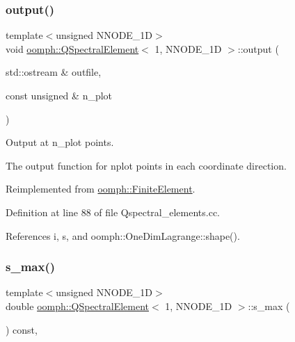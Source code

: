 \subsubsection{\texorpdfstring{output()}{output()}\hspace{0.1cm}{\footnotesize\ttfamily [4/4]}}
{\footnotesize\ttfamily template$<$unsigned N\+N\+O\+D\+E\+\_\+1D$>$ \\
void \hyperlink{classoomph_1_1QSpectralElement}{oomph\+::\+Q\+Spectral\+Element}$<$ 1, N\+N\+O\+D\+E\+\_\+1D $>$\+::output (\begin{DoxyParamCaption}\item[{std\+::ostream \&}]{outfile,  }\item[{const unsigned \&}]{n\+\_\+plot }\end{DoxyParamCaption})\hspace{0.3cm}{\ttfamily [virtual]}}



Output at n\+\_\+plot points. 

The output function for nplot points in each coordinate direction. 

Reimplemented from \hyperlink{classoomph_1_1FiniteElement_afa9d9b2670f999b43e6679c9dd28c457}{oomph\+::\+Finite\+Element}.



Definition at line 88 of file Qspectral\+\_\+elements.\+cc.



References i, s, and oomph\+::\+One\+Dim\+Lagrange\+::shape().

\mbox{\label{classoomph_1_1QSpectralElement_3_011_00_01NNODE__1D_01_4_ae69c91dbf1b80e9fef73ada0f899b8c8}} 
\subsubsection{\texorpdfstring{s\+\_\+max()}{s\_max()}}
{\footnotesize\ttfamily template$<$unsigned N\+N\+O\+D\+E\+\_\+1D$>$ \\
double \hyperlink{classoomph_1_1QSpectralElement}{oomph\+::\+Q\+Spectral\+Element}$<$ 1, N\+N\+O\+D\+E\+\_\+1D $>$\+::s\+\_\+max (\begin{DoxyParamCaption}{ }\end{DoxyParamCaption}) const\hspace{0.3cm}{\ttfamily [inline]}, {\ttfamily [virtual]}}



